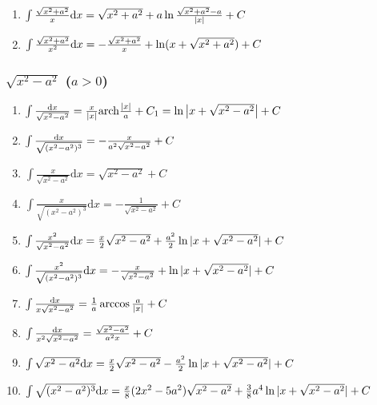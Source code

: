 \begin{tiny}
\begin{enumerate}[noitemsep]
\item $ \int \frac{\sqrt{x^2+a^2}}{x} \mathrm{d} x = \sqrt{x^2+a^2} + a \ln \frac{\sqrt{x^2+a^2}-a}{|x|} + C $

\item $ \int \frac{\sqrt{x^2+a^2}}{x^2} \mathrm{d} x = -\frac{\sqrt{x^2+a^2}}{x} + \ln(x + \sqrt{x^2+a^2}) + C $

\end{enumerate}

\subsubsection{$\sqrt{x^2-a^2}$ ($a>0$)}

\begin{enumerate}[noitemsep]

\item $ \int \frac{\mathrm{d} x}{\sqrt{x^2-a^2}} = \frac{x}{|x|} \mathrm{arch} \frac{|x|}{a} + C_1 = \ln\left|x+\sqrt{x^2-a^2}\right| + C $

\item $ \int \frac{\mathrm{d} x}{\sqrt{(x^2-a^2)^3}} = -\frac{x}{a^2\sqrt{x^2-a^2}} + C$

\item $ \int \frac{x}{\sqrt{x^2-a^2}} \mathrm{d}x = \sqrt{x^2-a^2} + C $

\item $ \int \frac{x}{\sqrt{(x^2-a^2)^3}} \mathrm{d}x = -\frac{1}{\sqrt{x^2-a^2}} + C $

\item $ \int \frac{x^2}{\sqrt{x^2-a^2}} \mathrm{d} x = \frac{x}{2}\sqrt{x^2-a^2} + \frac{a^2}{2}\ln|x+\sqrt{x^2-a^2}| + C $

\item $ \int \frac{x^2}{\sqrt{(x^2-a^2)^3}} \mathrm{d} x = -\frac{x}{\sqrt{x^2-a^2}} + \ln|x+\sqrt{x^2-a^2}| + C $

\item $ \int \frac{\mathrm{d} x}{x\sqrt{x^2-a^2}} = \frac{1}{a} \arccos \frac{a}{|x|} + C $

\item $ \int \frac{\mathrm{d} x}{x^2\sqrt{x^2-a^2}} = \frac{\sqrt{x^2-a^2}}{a^2x} + C $

\item $ \int \sqrt{x^2-a^2} \mathrm{d} x = \frac{x}{2}\sqrt{x^2-a^2} - \frac{a^2}{2}\ln|x + \sqrt{x^2-a^2}| + C $

\item $ \int \sqrt{(x^2-a^2)^3} \mathrm{d} x = \frac{x}{8}(2x^2-5a^2)\sqrt{x^2-a^2} + \frac{3}{8}a^4\ln|x + \sqrt{x^2-a^2}| + C $


\end{enumerate}
\end{tiny}
